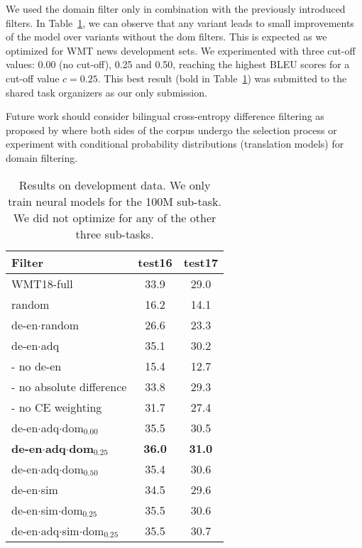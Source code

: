\documentclass[11pt,a4paper]{article}
\begin{document}
We used the domain filter only in combination with the previously introduced filters. In Table~\ref{dev}, we can observe that any variant leads to small improvements of the model over variants without the $\mathrm{dom}$ filters. This is expected as we optimized for WMT news development sets. We experimented with three cut-off values: 0.00 (no cut-off), 0.25 and 0.50, reaching the highest BLEU scores for a cut-off value $c=0.25$. This best result (bold in Table~\ref{dev}) was submitted to the shared task organizers as our only submission. 

Future work should consider bilingual cross-entropy difference filtering as proposed by  where both sides of the corpus undergo the selection process or experiment with conditional probability distributions (translation models) for domain filtering.


\begin{table}[t]
\centering
\begin{tabular}{lcc}\toprule
Filter & test16 & test17 \\ \midrule
WMT18-full & 33.9 & 29.0\\ 
random & 16.2 & 14.1 \\ \midrule
de-en$\cdot$random & 26.6 & 23.3 \\ \midrule
de-en$\cdot$adq & 35.1 & 30.2 \\
\quad - no de-en & 15.4 & 12.7 \\
\quad - no absolute difference   & 33.8 & 29.3 \\
\quad - no CE weighting & 31.7 & 27.4 \\ \midrule
 de-en$\cdot$adq$\cdot$dom$_{0.00}$ & 35.5 & 30.5 \\
\bf de-en$\cdot$adq$\cdot$dom$_{\mathbf{0.25}}$ & \bf 36.0 & \bf 31.0 \\
de-en$\cdot$adq$\cdot$dom$_{0.50}$ & 35.4 & 30.6 \\ \midrule
de-en$\cdot$sim & 34.5 & 29.6 \\
de-en$\cdot$sim$\cdot$dom$_{0.25}$ & 35.5 & 30.6 \\
de-en$\cdot$adq$\cdot$sim$\cdot$dom$_{0.25}$ & 35.5 & 30.7 \\

\bottomrule
\end{tabular}
\caption{Results on development data. We only train neural models for the 100M sub-task. We did not optimize for any of the other three sub-tasks.}
\label{dev}
\end{table}
\end{document}
